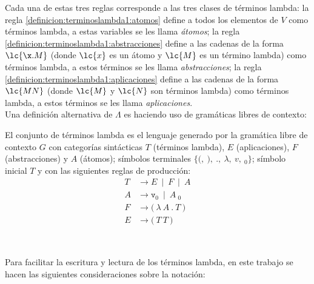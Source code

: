 Cada una de estas tres reglas corresponde a las tres clases de términos lambda: la regla \eqref{definicion:terminoslambda1:atomos} define a todos los elementos de \(V\) como términos lambda, a estas variables se les llama \emph{átomos}; la regla \eqref{definicion:terminoslambda1:abstracciones} define a las cadenas de la forma \(\lc{\x.M}\) (donde \(\lc{x}\) es un átomo y \(\lc{M}\) es un término lambda) como términos lambda, a estos términos se les llama \emph{abstracciones}; la regla \eqref{definicion:terminoslambda1:aplicaciones} define a las cadenas de la forma \(\lc{M N}\) (donde \(\lc{M}\) y \(\lc{N}\) son términos lambda) como términos lambda, a estos términos se les llama \emph{aplicaciones}. \\

Una definición alternativa de \(\Lambda\) es haciendo uso de gramáticas libres de contexto: \\

\begin{defi} El conjunto de términos lambda es el lenguaje generado por la gramática libre de contexto \(G\) con categorías sintácticas \(T\) (términos lambda), \(E\) (aplicaciones), \(F\) (abstracciones) y \(A\) (átomos); símbolos terminales \(\{\texttt{(},\ \texttt{)},\ \texttt{.},\ \lambda,\ v,\ {}_{0}\}\); símbolo inicial \(T\) y con las siguientes reglas de producción: \
  \label{definicion:terminoslambda2}
  \begin{subequations}
    \label{definicion:terminoslambda2:producciones}
    \begin{align}
      \label{definicion:terminoslambda2:terminos} \tag{a}
      T &\rightarrow E\ \mid\ F\ \mid\ A
      \\
      \label{definicion:terminoslambda2:atomos} \tag{b}
      A &\rightarrow \texttt{v}_{0}\ \mid\ A\ {}_{0}
      \\
      \label{definicion:terminoslambda2:abstracciones} \tag{c}
      F &\rightarrow \texttt{(}\ \lambda\ A\ \texttt{.}\ T\ \texttt{)}
      \\
      \label{definicion:terminoslambda2:aplicaciones} \tag{d}
      E &\rightarrow \texttt{(}\ T\ T\ \texttt{)}
    \end{align}
  \end{subequations}
\end{defi} \

Para facilitar la escritura y lectura de los términos lambda, en este trabajo se hacen las siguientes consideraciones sobre la notación: \\

